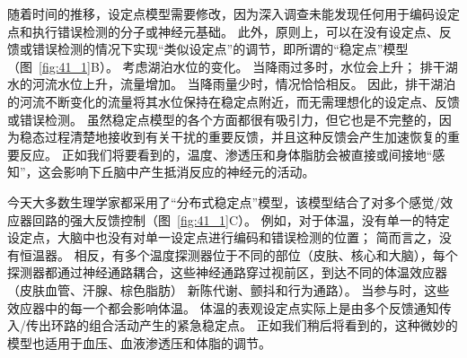 随着时间的推移，设定点模型需要修改，因为深入调查未能发现任何用于编码设定点和执行错误检测的分子或神经元基础。
此外，原则上，可以在没有设定点、反馈或错误检测的情况下实现“类似设定点”的调节，即所谓的“稳定点”模型（图~\ref{fig:41_1}B）。
考虑湖泊水位的变化。
当降雨过多时，水位会上升；
排干湖水的河流水位上升，流量增加。
当降雨量少时，情况恰恰相反。
因此，排干湖泊的河流不断变化的流量将其水位保持在稳定点附近，而无需理想化的设定点、反馈或错误检测。
虽然稳定点模型的各个方面都很有吸引力，但它也是不完整的，因为稳态过程清楚地接收到有关干扰的重要反馈，并且这种反馈会产生加速恢复的重要反应。
正如我们将要看到的，温度、渗透压和身体脂肪会被直接或间接地“感知”，这会影响下丘脑中产生抵消反应的神经元的活动。


今天大多数生理学家都采用了“分布式稳定点”模型，该模型结合了对多个感觉/效应器回路的强大反馈控制（图~\ref{fig:41_1}C）。
例如，对于体温，没有单一的特定设定点，大脑中也没有对单一设定点进行编码和错误检测的位置；
简而言之，没有恒温器。
相反，有多个温度探测器位于不同的部位（皮肤、核心和大脑），每个探测器都通过神经通路耦合，这些神经通路穿过视前区，到达不同的体温效应器（皮肤血管、汗腺、棕色脂肪） 新陈代谢、颤抖和行为通路）。
当参与时，这些效应器中的每一个都会影响体温。
体温的表观设定点实际上是由多个反馈通知传入/传出环路的组合活动产生的紧急稳定点。
正如我们稍后将看到的，这种微妙的模型也适用于血压、血液渗透压和体脂的调节。


